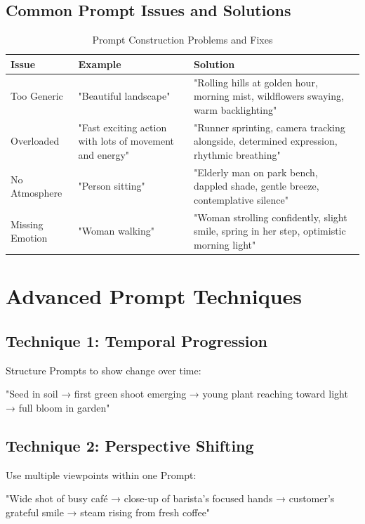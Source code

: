 \subsection*{Common Prompt Issues and Solutions}
\begin{table}[H]
\centering
\caption{Prompt Construction Problems and Fixes \\ \authorillustration}
\label{tab:Prompt-issues}
\begin{tabular}{p{4cm}p{4cm}p{5cm}}
\hline
\textbf{Issue} & \textbf{Example} & \textbf{Solution} \\
\hline
Too Generic & "Beautiful landscape" & "Rolling hills at golden hour, morning mist, wildflowers swaying, warm backlighting" \\
\hline
Overloaded & "Fast exciting action with lots of movement and energy" & "Runner sprinting, camera tracking alongside, determined expression, rhythmic breathing" \\
\hline
No Atmosphere & "Person sitting" & "Elderly man on park bench, dappled shade, gentle breeze, contemplative silence" \\
\hline
Missing Emotion & "Woman walking" & "Woman strolling confidently, slight smile, spring in her step, optimistic morning light" \\
\hline
\end{tabular}
\end{table}

\section*{Advanced Prompt Techniques}

\subsection*{Technique 1: Temporal Progression}
Structure Prompts to show change over time:
\begin{Prompt}
"Seed in soil → first green shoot emerging → young plant reaching toward light → full bloom in garden"
\end{Prompt}

\subsection*{Technique 2: Perspective Shifting}
Use multiple viewpoints within one Prompt:
\begin{Prompt}
"Wide shot of busy café → close-up of barista's focused hands → customer's grateful smile → steam rising from fresh coffee"
\end{Prompt}

